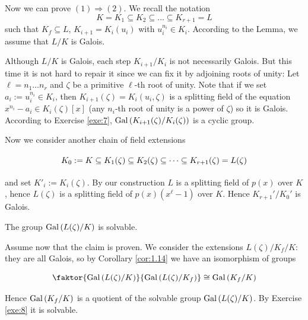 \documentclass[twoside = false,	%
		headsepline,		%
		parskip = true,
		]{scrbook}						%
\begin{document}
    Now we can prove $(1) \Rightarrow (2)$. We recall the notation
    \begin{equation*}
        K = K_1 \subseteq K_2 \subseteq \dots \subseteq K_{r+1} = L
    \end{equation*}
    such that $K_f \subseteq L$, $K_{i+1} = K_i(u_i)$ with $u_i^{n_i} \in K_i$. According to the Lemma, we assume that $L/K$ is Galois.
    
    Although $L/K$ is Galois, each step $K_{i+1}/K_i$ is not necessarily Galois. But this time it is not hard to repair it since we can fix it by adjoining roots of unity:
    Let $\ell = n_1 \dots n_r$ and $\zeta$ be a primitive $\ell$-th root of unity. Note that if we set $a_i := u_i^{n_i} \in K_i$, then $K_{i+1}(\zeta) = K_i(u_i,\zeta)$ is a splitting field of the equation $x^{n_i} - a_i \in K_i(\zeta)[x]$ (any $n_i$-th root of unity is a power of $\zeta$) so it is Galois.
    According to Exercise \ref{exe:7}, $\mathrm{Gal}\left( K_{i+1}(\zeta)/K_i(\zeta)\right)$ is a cyclic group.
    
    Now we consider another chain of field extensions
    
    \begin{equation*}
        \xymatrix{
            K_0 := K \subseteq K_1(\zeta) \subseteq K_2(\zeta) \subseteq \dots \subseteq K_{r+1}(\zeta) = L(\zeta)
        }
    \end{equation*}
    
    and set $K'_i:= K_i(\zeta)$. By our construction $L$ is a splitting field of $p(x)$ over $K$, hence $L(\zeta)$ is a splitting field of $p(x)(x^\ell - 1)$ over $K$. Hence $K_{r+1}'/K_0'$ is Galois.
    
    \begin{claim*}{}{}
        The group $\mathrm{Gal}\left( L(\zeta)/K\right)$ is solvable.
    \end{claim*}
    
    Assume now that the claim is proven. We consider the extensions $L(\zeta)/K_f /K$: they are all Galois, so by Corollary \ref{cor:1.14} we have an isomorphism of groups
    
    \begin{equation*}
        \faktor{\Gal{L(\zeta)/K}}{\Gal{L(\zeta)/K_f}} \cong \Gal{K_f / K}
    \end{equation*}
    
    Hence $\mathrm{Gal}\left( K_f/K\right)$ is a quotient of the solvable group $\mathrm{Gal}\left( L(\zeta)/K\right)$. By Exercise \ref{exe:8} it is solvable.
    
\end{document}
